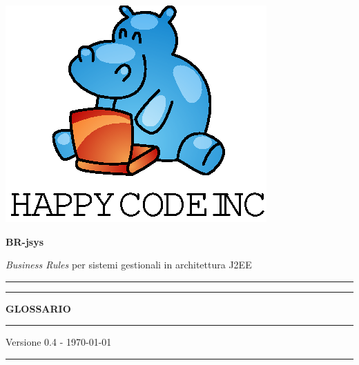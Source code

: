 \documentclass[11pt,titlepage,a4paper]{report}
\begin{document}
\begin{titlepage}
\begin{center}
\vspace*{0.5in}
\includegraphics{logo.eps}
\vspace*{0.2in}

{\Large \textbf{BR-jsys}}

{\Large \emph{Business Rules} per sistemi gestionali in architettura J2EE } 
\vspace{1.3in}
\par\rule{10cm}{.4pt} \par
\par\rule{12cm}{1pt} \par
\vspace*{0.5in}
\LARGE \textbf {GLOSSARIO}
\vspace*{0.5in}
\par\rule{12cm}{1pt} \par
{\large Versione 0.4 - \today}
\par\rule{10cm}{.4pt} \par

\end{center}
\end{titlepage}
\vspace*{0.5in}
\end{document}
